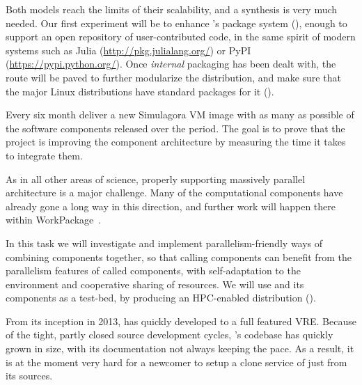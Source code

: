 \begin{workpackage}[id=component-architecture,wphases=0-48!.5,
  title=Component Architecture,lead=UV,
  PSRM=24,UVRM=8,SARM=16, USHRM=4]
\begin{tasklist}
\begin{task}[title=Modularization and packaging,id=mod-packaging,lead=UV,PM=32]
    Both models reach the limits of their scalability, and a synthesis
    is very much needed.  Our first experiment will be to enhance
    \Sage's package system
    (), enough to
    support an open repository of user-contributed code, in the same
    spirit of modern systems such as Julia
    (\url{http://pkg.julialang.org/}) or PyPI
    (\url{https://pypi.python.org/}).  Once \emph{internal} packaging
    has been dealt with, the route will be paved to further modularize
    the \Sage distribution, and make sure that the major Linux
    distributions have standard packages for it
    ().

  \end{task}

\begin{task}[id=simulagora-dev,title=Simulagora integration,PM=4,lead=LL]
  Every six month deliver a new Simulagora VM image with as many as possible of the software
  components released over the period. The goal is to prove that the project is
  improving the component architecture by measuring the time it takes to
  integrate them.
\end{task}


  \begin{task}[title=Component architecture for High Performance Computing and Parallelism,id=component-for-HPC,PM=12]
    As in all other areas of science, properly supporting massively
    parallel architecture is a major challenge. Many of the
    computational components have already gone a long way in this
    direction, and further work will happen there within
    WorkPackage~.

    In this task we will investigate and implement
    parallelism-friendly ways of combining components together, so
    that calling components can benefit from the parallelism features
    of called components, with self-adaptation to the environment and
    cooperative sharing of resources. We will use \Sage and its
    components as a test-bed, by producing an HPC-enabled distribution
    ().
  \end{task}

  \begin{task}[title=Document and modularize \SMC's codebase,id=extract-smc,lead=PS,PM=10]
    From its inception in 2013, \SMC has quickly developed to a full
    featured VRE.  Because of the tight, partly closed source
    development cycles, \SMC's codebase has quickly grown in size,
    with its documentation not always keeping the pace. As a result,
    it is at the moment very hard for a newcomer to setup a clone
    service of \SMC just from its sources.


\end{task}
\end{tasklist}
\end{workpackage}

